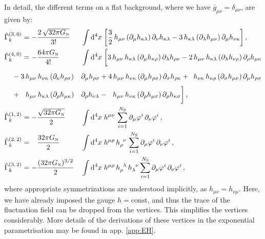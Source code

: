 \documentclass[11pt]{book}
\newcommand\NS{ N_{\scriptscriptstyle{\mathrm{S}}} }
\newcommand\GNewton{ G_{\scriptscriptstyle{\mathrm{N}}}{} }
\numberwithin{equation}{chapter}
\begin{document}
In detail, the different terms on a flat background, where we have $\bar{g}_{\mu \nu} = \delta_{\mu \nu}$, are given by:
\begin{alignat}{2}
  &\hat \Gamma^{(3,\, 0)}_k = -\frac{ 2 \, \sqrt{32\pi \GNewton} }{ 3! } &&\int \mathrm d^4x \;
  \bigg[
    \frac{3}{2} \, h_{\mu\nu} \left(\partial_{\mu}h_{\kappa\lambda} \right)\partial_{\nu}h_{\kappa\lambda}
    - 3 \, h_{\kappa \lambda} \left(\partial_{\lambda}h_{\mu\nu} \right)\partial_{\mu}h_{\nu\kappa}
  \bigg] \,, \label{GammaG3} \\
  &\hat \Gamma^{(4,\, 0)}_k = - \frac{ 64\pi \GNewton }{ 4! }  &&\int \mathrm d^4x \;
  \bigg[
    3 \, h_{\mu\nu} \, h_{\kappa\lambda}  \left( \partial_{\mu} h_{\kappa\rho} \right) \partial_{\lambda}h_{\rho\nu}
    - 2 \, h_{\mu\nu} \, h_{\kappa \lambda} \left( \partial_{\lambda} h_{\nu\rho} \right) \partial_{\rho} h_{\mu\kappa} \nonumber \\
    & \hspace{3.8mm} \vphantom{ \frac{ 64\pi \GNewton }{ 4! } } - 3 \, h_{\mu\nu} \, h_{\nu\kappa} \left( \partial_{\kappa} h_{\rho\sigma} \right) && \partial_{\mu}h_{\rho\sigma}
    + 4 \, h_{\mu\nu} \, h_{\nu\kappa} \left( \partial_{\mu} h_{\rho\sigma} \right) \partial_{\sigma} h_{\rho\kappa}
    + \hphantom{3} h_{\nu\kappa} \, h_{\kappa\rho} \left( \partial_{\sigma} h_{\mu\nu} \right) \partial_{\mu} h_{\rho\sigma} \nonumber \\
    & \hspace{3.8mm} \vphantom{ \frac{ 64\pi \GNewton }{ 4! } } + \hphantom{3\,} h_{\mu\nu} \, h_{\kappa\lambda} \left( \partial_{\rho} h_{\mu\kappa} \right) && \partial_{\rho} h_{\nu\lambda}
    - \hphantom{4\, } h_{\mu\nu} \, h_{\nu\kappa} \left(\partial_{\rho} h_{\mu\sigma}\right) \partial_{\rho} h_{\kappa\sigma}
  \bigg] \,, \label{GammaG4}\\
  &\hat \Gamma^{(1,\, 2)}_k = - \frac{\sqrt{32 \pi  \GNewton}}{2}        &&\int \mathrm d^4x \; h^{\mu \nu}  \,
    \sum_{i=1}^{\NS} \partial_{\mu}\varphi^i \, \partial_{\nu}\varphi^i \,, \label{Gammag3} \\
  &\hat \Gamma^{(2,\, 2)}_k = \hphantom{-} \frac{32 \pi  \GNewton}{2}    &&\int \mathrm d^4x \; h^{\mu \rho} \, h_{\rho}^{\phantom{\rho}\nu} \,
    \sum_{i=1}^{\NS} \partial_{\mu}\varphi^i \, \partial_{\nu}\varphi^i \,, \label{Gammag4} \\
  &\hat \Gamma^{(3,\, 2)}_k = - \frac{     (32 \pi  \GNewton)^{3/2}}{2}  &&\int \mathrm d^4x \; h^{\mu \rho} \, h_{\rho}^{\phantom{\rho}\lambda} \, h_{\lambda}^{\phantom{\lambda}\nu}
    \sum_{i=1}^{\NS} \partial_{\mu}\varphi^i \, \partial_{\nu}\varphi^i \,, \label{Gammag5}
\end{alignat}
where appropriate symmetrizations are understood implicitly, as $h_{\mu \nu} = h_{\nu \mu}$.
Here, we have already imposed the gauge $h = \mathrm{const}$,
and thus the trace of the fluctuation field can be dropped from the vertices.
This simplifies the vertices considerably. More details of the derivations of these vertices
in the exponential parametrisation may be found in app. \ref{app:EH}.
\end{document}

